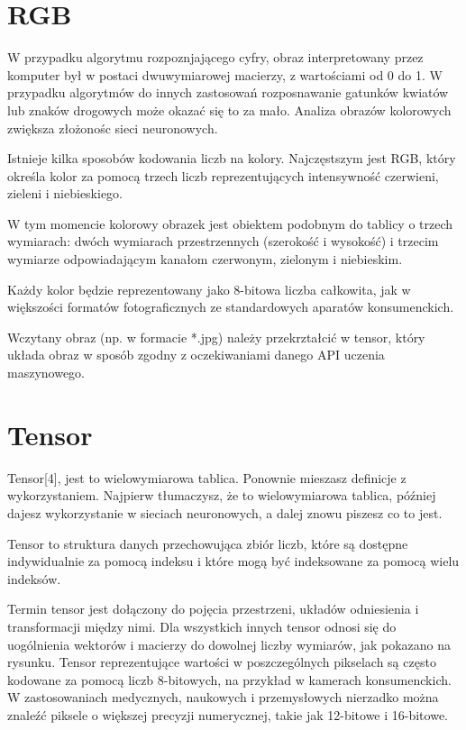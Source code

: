 \documentclass[brudnopis]{xmgr}
\begin{document}
 \section{RGB\label{s:dsssl}}
 
 W przypadku algorytmu rozpoznjającego cyfry, obraz interpretowany przez komputer był w postaci dwuwymiarowej macierzy, z wartościami od 0 do 1. W przypadku algorytmów do innych zastosowań rozposnawanie gatunków kwiatów lub znaków drogowych może okazać się to za mało. Analiza obrazów kolorowych zwiększa złożonośc sieci neuronowych. 
 
Istnieje kilka sposobów kodowania liczb na kolory. Najczęstszym jest
RGB, który określa kolor za pomocą trzech liczb reprezentujących intensywność czerwieni, zieleni i niebieskiego. 

W tym momencie kolorowy obrazek jest obiektem podobnym do tablicy o trzech wymiarach: dwóch wymiarach przestrzennych (szerokość i wysokość) i trzecim wymiarze odpowiadającym kanałom czerwonym, zielonym i niebieskim. 

Każdy kolor będzie reprezentowany jako 8-bitowa liczba całkowita, jak w większości formatów fotograficznych ze standardowych aparatów konsumenckich.

Wczytany obraz (np. w formacie *.jpg) należy przekrztałcić w tensor, który układa obraz w sposób zgodny z oczekiwaniami danego API uczenia maszynowego.

\section{Tensor\label{s:dsssl}}

Tensor[4], jest to wielowymiarowa tablica. 
Ponownie mieszasz definicje z wykorzystaniem. Najpierw tłumaczysz, że to wielowymiarowa tablica, później dajesz wykorzystanie w sieciach neuronowych, a dalej znowu piszesz co to jest.

Tensor to struktura danych przechowująca zbiór liczb, które są dostępne indywidualnie za pomocą indeksu i które mogą być indeksowane za pomocą wielu indeksów.

Termin tensor jest dołączony do pojęcia przestrzeni, układów odniesienia i transformacji między nimi. Dla wszystkich innych tensor odnosi się do uogólnienia wektorów i macierzy do dowolnej liczby wymiarów, jak pokazano na rysunku.
Tensor reprezentujące wartości w poszczególnych pikselach są często kodowane za pomocą liczb 8-bitowych, na przykład w kamerach konsumenckich. W zastosowaniach medycznych, naukowych i przemysłowych nierzadko można znaleźć piksele o większej precyzji numerycznej, takie jak 12-bitowe i 16-bitowe.
\end{document}
